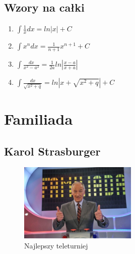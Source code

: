 \documentclass{article}
\begin{document}
\subsection{Wzory na całki}
\begin{enumerate}
\item $\int\frac{1}{x}dx = ln|x| + C$
\item $\int x^{n} dx = \frac{1}{n+1} x^{n+1} + C $
\item $\int\frac{dx}{x^{2} - a ^{2}} = \frac{1}{2a}ln|\frac{x-a}{x+a}|$
\item $\int\frac{dx}{\sqrt{x^{2} + q}} = ln|x+\sqrt{x^{2}+q}| + C$
\end{enumerate}

\section{Familiada}
\subsection{Karol Strasburger}
\begin{figure}[htbp]
\centering
\includegraphics[width=0.5\textwidth]{foto1.jpg}
\caption{Najlepszy teleturniej}
\end{figure}
\end{document}
